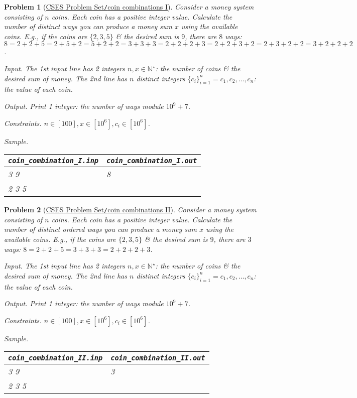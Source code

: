 \documentclass{article}
\newtheorem{problem}{Problem}
\begin{document}
\begin{problem}[\href{https://cses.fi/problemset/task/1635}{CSES Problem Set{\tt/}coin combinations I}]
	Consider a money system consisting of $n$ coins. Each coin has a positive integer value. Calculate the number of distinct ways you can produce a money sum $x$ using the available coins. E.g., if the coins are $\{2,3,5\}$ \& the desired sum is $9$, there are $8$ ways: $8 = 2 + 2 + 5 = 2 + 5 + 2 = 5 + 2 + 2 = 3 + 3 + 3 = 2 + 2 + 2 + 3 = 2 + 2 + 3 + 2 = 2 + 3 + 2 + 2 = 3 + 2 + 2 + 2$.
	\item {\sf Input.} The 1st input line has 2 integers $n,x\in\mathbb{N}^\star$: the number of coins \& the desired sum of money. The 2nd line has $n$ distinct integers $\{c_i\}_{i=1}^n = c_1,c_2,\ldots,c_n$: the value of each coin.
	\item {\sf Output.} Print 1 integer: the number of ways module $10^9 + 7$.
	\item {\sf Constraints.} $n\in[100],x\in[10^6],c_i\in[10^6]$.
	\item {\sf Sample.}
	\begin{table}[H]
		\centering
		\begin{tabular}{|l|l|}
			\hline
			\verb|coin_combination_I.inp| & \verb|coin_combination_I.out| \\
			\hline
			3 9 & 8 \\
			2 3 5 & \\
			\hline
		\end{tabular}
	\end{table}
\end{problem}

\begin{problem}[\href{https://cses.fi/problemset/task/1636}{CSES Problem Set{\tt/}coin combinations II}]
	Consider a money system consisting of $n$ coins. Each coin has a positive integer value. Calculate the number of distinct ordered ways you can produce a money sum $x$ using the available coins. E.g., if the coins are $\{2,3,5\}$ \& the desired sum is $9$, there are $3$ ways: $8 = 2 + 2 + 5 = 3 + 3 + 3 = 2 + 2 + 2 + 3$.
	\item {\sf Input.} The 1st input line has 2 integers $n,x\in\mathbb{N}^\star$: the number of coins \& the desired sum of money. The 2nd line has $n$ distinct integers $\{c_i\}_{i=1}^n = c_1,c_2,\ldots,c_n$: the value of each coin.
	\item {\sf Output.} Print 1 integer: the number of ways module $10^9 + 7$.
	\item {\sf Constraints.} $n\in[100],x\in[10^6],c_i\in[10^6]$.
	\item {\sf Sample.}
	\begin{table}[H]
		\centering
		\begin{tabular}{|l|l|}
			\hline
			\verb|coin_combination_II.inp| & \verb|coin_combination_II.out| \\
			\hline
			3 9 & 3 \\
			2 3 5 & \\
			\hline
		\end{tabular}
	\end{table}
\end{problem}
\end{document}
